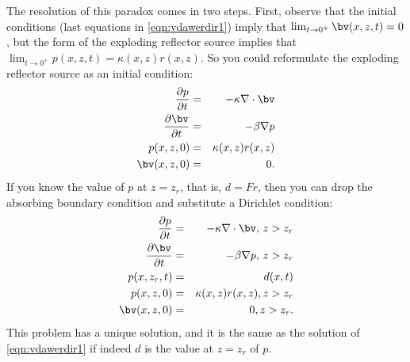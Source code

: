 The resolution of this paradox comes in two steps. First, observe that the initial conditions (last equations in \ref{eqn:vdawerdir1}) imply  that $\lim_{t\rightarrow 0^+} \bv(x,z,t) = 0$, but the form of the exploding reflector source implies that $\lim_{t\rightarrow 0^+} p(x,z,t) = \kappa(x,z)r(x,z)$. So you could reformulate the exploding reflector source as an initial condition:
\begin{eqnarray}
\label{eqn:vdawerdir1}
\frac{\partial p}{\partial t}&=& -\kappa \nabla \cdot \bv  \nonumber \\
\frac{\partial \bv}{\partial t} &=& -\beta \nabla p\nonumber \\
p(x,z,0) & = & \kappa(x,z)r(x,z)\nonumber \\
\bv(x,z,0) & = & 0. 
\end{eqnarray}
If you know the value of $p$ at $z=z_r$, that is, $d=Fr$, then you can drop the absorbing boundary condition and substitute a Dirichlet condition:
\begin{eqnarray}
\label{eqn:vdawerdir2}
\frac{\partial p}{\partial t}&=& -\kappa \nabla \cdot \bv , \, z>z_r \nonumber \\
\frac{\partial \bv}{\partial t} &=& -\beta \nabla p, \, z>z_r \nonumber \\
p(x,z_r,t) & = & d(x,t) \nonumber \\
p(x,z,0) & = & \kappa(x,z)r(x,z), z > z_r \nonumber \\
\bv(x,z,0) & = & 0, z > z_r. 
\end{eqnarray}
This problem has a unique solution, and it is the same as the solution of \ref{eqn:vdawerdir1} if indeed $d$ is the value at $z=z_r$ of $p$. 

